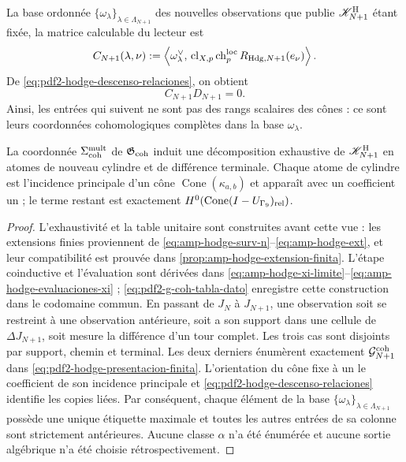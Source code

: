 La base ordonnée
\(\{\omega_\lambda\}_{\lambda\in\Lambda_{N+1}}\) des nouvelles observations
que publie \(\mathscr K^{\rm H}_{N+1}\) étant fixée, la matrice calculable du lecteur est
\begin{equation}\label{eq:pdf2-hodge-matriz-lector}
 C_{N+1}(\lambda,\nu):=
 \left\langle\omega_\lambda^\vee,\,
 \operatorname{cl}_{X,p}\operatorname{ch}^{\rm loc}_p
 R_{{\rm Hdg},N+1}(e_\nu)\right\rangle .
\end{equation}
De \eqref{eq:pdf2-hodge-descenso-relaciones}, on obtient
\begin{equation}\label{eq:pdf2-hodge-cd-cero}
 C_{N+1}D_{N+1}=0.
\end{equation}
Ainsi, les entrées qui suivent ne sont pas des rangs scalaires des cônes : ce sont leurs
coordonnées cohomologiques complètes dans la base \(\omega_\lambda\).

\begin{proposition}
\label{prop:pdf2-hodge-exhaustividad-owner}
La coordonnée $\Sigma_{\rm coh}^{\rm mult}$ de
$\mathfrak G_{\rm coh}$ induit une décomposition exhaustive de
$\mathscr K^{\rm H}_{N+1}$ en atomes de nouveau cylindre et de différence
terminale. Chaque atome de cylindre est l'incidence principale d'un cône
$\operatorname{Cone}(\kappa_{a,b})$ et apparaît avec un coefficient un ; le
terme restant est exactement
$H^0(\operatorname{Cone}(I-U_{\Gamma_9})_{\rm rel})$.
\end{proposition}

\begin{proof}
L'exhaustivité et la table unitaire sont construites avant cette vue : les
extensions finies proviennent de
\eqref{eq:amp-hodge-surv-n}--\eqref{eq:amp-hodge-ext}, et leur compatibilité est
prouvée dans \cref{prop:amp-hodge-extension-finita}. L'étape coinductive et
l'évaluation sont dérivées dans
\eqref{eq:amp-hodge-xi-limite}--\eqref{eq:amp-hodge-evaluaciones-xi} ;
\eqref{eq:pdf2-g-coh-tabla-dato} enregistre cette construction dans le codomaine
commun. En passant de $J_N$ à $J_{N+1}$, une observation soit
se restreint à une observation antérieure, soit a son support dans une cellule de
$\Delta J_{N+1}$, soit mesure la différence d'un tour complet. Les
trois cas sont disjoints par support, chemin et terminal. Les deux derniers
énumèrent exactement \(\mathcal G_{N+1}^{\rm coh}\) dans
\eqref{eq:pdf2-hodge-presentacion-finita}. L'orientation du cône fixe à
un le coefficient de son incidence principale et
\eqref{eq:pdf2-hodge-descenso-relaciones} identifie les copies liées.
Par conséquent, chaque élément de la base
\(\{\omega_\lambda\}_{\lambda\in\Lambda_{N+1}}\) possède une unique étiquette
maximale et toutes les autres entrées de sa colonne sont strictement antérieures.
Aucune classe \(\alpha\) n'a été énumérée et aucune sortie
algébrique n'a été choisie rétrospectivement.
\end{proof}

